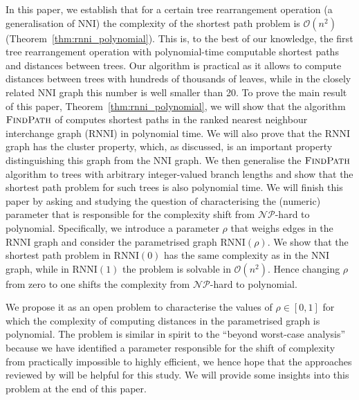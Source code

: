 \documentclass[11pt]{amsart}
\newcommand{\rnni}{\mathrm{RNNI}}
\newcommand{\findpath}{\textsc{FindPath}}
\newcommand{\nni}{\mathrm{NNI}}
\newcommand{\np}{\mathcal{NP}}
\renewcommand{\O}{\mathcal O}
\newcommand{\summary}[1]{} %
\begin{document}
\summary{Paper summary in light of motivation: We've discovered the first efficiently computable distance, given by a parameter range in known tree spaces, and want to understand the reason for the complexity jump -- cite ``Beyond worst-case complexity.''}
In this paper, we establish that for a certain tree rearrangement operation (a generalisation of $\nni$) the complexity of the shortest path problem is $\O(n^2)$ (Theorem~\ref{thm:rnni_polynomial}).
This is, to the best of our knowledge, the first tree rearrangement operation with polynomial-time computable shortest paths and distances between trees.
Our algorithm is practical as it allows to compute distances between trees with hundreds of thousands of leaves, while in the closely related $\nni$ graph this number is well smaller \autocite{Whidden2016-kl} than 20.
To prove the main result of this paper, Theorem~\ref{thm:rnni_polynomial}, we will show that the algorithm $\findpath$ of \textcite{Collienne2019-ca} computes shortest paths in the ranked nearest neighbour interchange graph ($\rnni$) in polynomial time.
We will also prove that the $\rnni$ graph has the cluster property, which, as discussed, is an important property distinguishing this graph from the $\nni$ graph.
We then generalise the $\findpath$ algorithm to trees with arbitrary integer-valued branch lengths and show that the shortest path problem for such trees is also polynomial time.
We will finish this paper by asking and studying the question of characterising the (numeric) parameter that is responsible for the complexity shift from $\np$-hard to polynomial.
Specifically, we introduce a parameter $\rho$ that weighs edges in the $\rnni$ graph and consider the parametrised graph $\rnni(\rho)$.
We show that the shortest path problem in $\rnni(0)$ has the same complexity as in the $\nni$ graph, while in $\rnni(1)$ the problem is solvable in $\O(n^2)$.
Hence changing $\rho$ from zero to one shifts the complexity from $\np$-hard to polynomial.

We propose it as an open problem to characterise the values of $\rho \in [0,1]$ for which the complexity of computing distances in the parametrised graph is polynomial.
The problem is similar in spirit to the ``beyond worst-case analysis'' \autocite{Roughgarden2019-to} because we have identified a parameter responsible for the shift of complexity from practically impossible to highly efficient, we hence hope that the approaches reviewed by \textcite{Roughgarden2019-to} will be helpful for this study.
We will provide some insights into this problem at the end of this paper.
\end{document}
